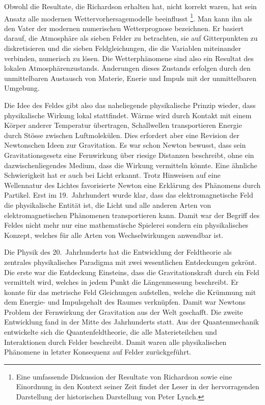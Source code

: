 Obwohl die Resultate, die Richardson erhalten hat, nicht korrekt waren,
hat sein Ansatz alle modernen Wettervorhersagemodelle beeinflusst%
\footnote{Eine umfassende Diskussion der Resultate von Richardson sowie
eine Einordnung in den Kontext seiner Zeit findet der Leser in der
hervorragenden Darstellung der historischen Darstellung \cite{buch:lynch}
von Peter Lynch.}.
Man kann ihn als den Vater der modernen numerischen Wetterprognose
bezeichnen.
Er basiert darauf, die Atmosphäre als sieben Felder zu betrachten,
sie auf Gitterpunkten zu diskretisieren und die sieben Feldgleichungen,
die die Variablen miteinander verbinden, numerisch zu lösen.
Die Wetterphänomene sind also ein Resultat des lokalen Atmosphärenzustands.
Änderungen dieses Zustands erfolgen durch den unmittelbaren Austausch
von Materie, Enerie und Impuls mit der unmittelbaren Umgebung.

Die Idee des Feldes gibt also das naheliegende physikalische Prinzip
wieder, dass physikalische Wirkung lokal stattfindet.
Wärme wird durch Kontakt mit einem Körper anderer Temperatur übertragen,
Schallwellen transportieren Energie durch Stösse zwischen Luftmolekülen.
Dies erfordert aber eine Revision der Newtonschen Ideen zur
Gravitation.
Es war schon Newton bewusst, dass sein Gravitationsgesetz eine 
Fernwirkung über riesige Distanzen beschreibt, ohne ein dazwischenliegendes
Medium, dass die Wirkung vermitteln könnte.
Eine ähnliche Schwierigkeit hat er auch bei Licht erkannt.
Trotz Hinweisen auf eine Wellennatur des Lichtes favorisierte Newton
eine Erklärung des Phänomens durch Partikel.
Erst im 19.~Jahrhundert wurde klar, dass das elektromagnetische Feld
die physikalische Entität ist, die Licht und alle anderen Arten von
elektromagnetischen Phänomenen transportieren kann.
Damit war der Begriff des Feldes nicht mehr nur eine mathematische
Spielerei sondern ein physikalisches Konzept, welches für alle Arten
von Wechselwirkungen anwendbar ist.

Die Physik des 20.~Jahrhunderts hat die Entwicklung der Feldtheorie als
zentrales physikalisches Paradigma mit zwei wesentlichen Entdeckungen
gekrönt.
Die erste war die Entdeckung Einsteins, dass die Gravitationskraft
durch ein Feld vermittelt wird, welches in jedem Punkt die Längenmessung
beschreibt.
Er konnte für das metrische Feld Gleichungen aufstellen, welche die
Krümmung mit dem Energie- und Impulsgehalt des Raumes verknüpfen.
Damit war Newtons Problem der Fernwirkung der Gravitation aus der Welt
geschafft.
Die zweite Entwicklung fand in der Mitte des Jahrhunderts statt.
Aus der Quantenmechanik entwickelte sich die Quantenfeldtheorie, die
alle Materieteilchen und Interaktionen durch Felder beschreibt.
Damit waren alle physikalischen Phänomene in letzter Konsequenz auf
Felder zurückgeführt.

